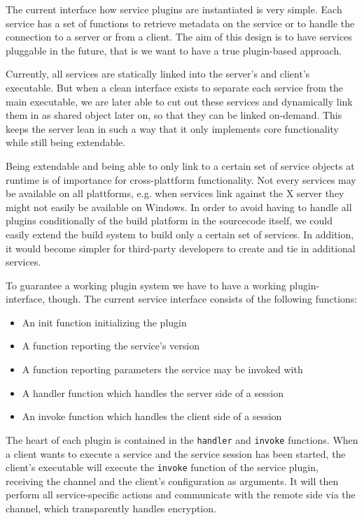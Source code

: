 The current interface how service plugins are instantiated is very simple.
Each service has a set of functions to retrieve metadata on the service or to handle the connection to a server or from a client.
The aim of this design is to have services pluggable in the future, that is we want to have a true plugin-based approach.

Currently, all services are statically linked into the server's and client's executable.
But when a clean interface exists to separate each service from the main executable, we are later able to cut out these services and dynamically link them in as shared object later on, so that they can be linked on-demand.
This keeps the server lean in such a way that it only implements core functionality while still being extendable.

Being extendable and being able to only link to a certain set of service objects at runtime is of importance for cross-plattform functionality.
Not every services may be available on all plattforms, e.g. when services link against the X server they might not easily be available on Windows.
In order to avoid having to handle all plugins conditionally of the build platform in the sourcecode itself, we could easily extend the build system to build only a certain set of services.
In addition, it would become simpler for third-party developers to create and tie in additional services.

\medskip

To guarantee a working plugin system we have to have a working plugin-interface, though.
The current service interface consists of the following functions:
\begin{itemize}
    \item An init function initializing the plugin
    \item A function reporting the service's version
    \item A function reporting parameters the service may be invoked with
    \item A handler function which handles the server side of a session
    \item An invoke function which handles the client side of a session
\end{itemize}

The heart of each plugin is contained in the \lstinline{handler} and \lstinline{invoke} functions.
When a client wants to execute a service and the service session has been started, the client's executable will execute the \lstinline{invoke} function of the service plugin, receiving the channel and the client's configuration as arguments.
It will then perform all service-specific actions and communicate with the remote side via the channel, which transparently handles encryption.

